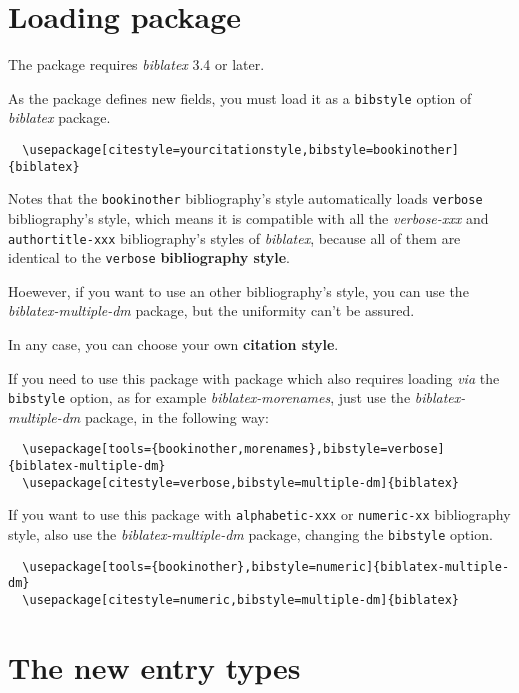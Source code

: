 \documentclass{ltxdockit}[2011/03/25]
\newcommand{\pkg}[1]{\emph{#1}}
\newcommand{\biblatex}{\emph{biblatex}\xspace}
\newcommand{\namebibstyle}[1]{\texttt{#1}}
\begin{document}
\section{Loading package}

The package requires \emph{biblatex} 3.4 or later.
 

As the package defines new fields, you must load it as a \verb+bibstyle+ option of \biblatex package.
 
\begin{verbatim}
  \usepackage[citestyle=yourcitationstyle,bibstyle=bookinother]{biblatex}
\end{verbatim}

Notes that the \namebibstyle{bookinother} bibliography's style automatically loads \namebibstyle{verbose} bibliography's style, which means it is  compatible with all the \emph{verbose-xxx} and \namebibstyle{authortitle-xxx} bibliography's  styles of \biblatex, because all of them are identical to the \namebibstyle{verbose} \textbf{bibliography style}.

Hoewever, if you want to use an other bibliography's style, you can use the \pkg{biblatex-multiple-dm} package, but the uniformity can't be assured.
 
In any case, you can choose your own \textbf{citation style}.
 
\label{morenames}If you need to use this package with package which also requires loading \emph{via} the \verb+bibstyle+ option, as for example \pkg{biblatex-morenames}, just use the \pkg{biblatex-multiple-dm} package, in the following way:

\begin{verbatim}
  \usepackage[tools={bookinother,morenames},bibstyle=verbose]{biblatex-multiple-dm}
  \usepackage[citestyle=verbose,bibstyle=multiple-dm]{biblatex}
\end{verbatim}

If you want to use this package with \namebibstyle{alphabetic-xxx} or \namebibstyle{numeric-xx} bibliography style, also use the \pkg{biblatex-multiple-dm} package, changing the \verb+bibstyle+ option.

\begin{verbatim}
  \usepackage[tools={bookinother},bibstyle=numeric]{biblatex-multiple-dm}
  \usepackage[citestyle=numeric,bibstyle=multiple-dm]{biblatex}
\end{verbatim}

\section{The new entry types}
\end{document}
